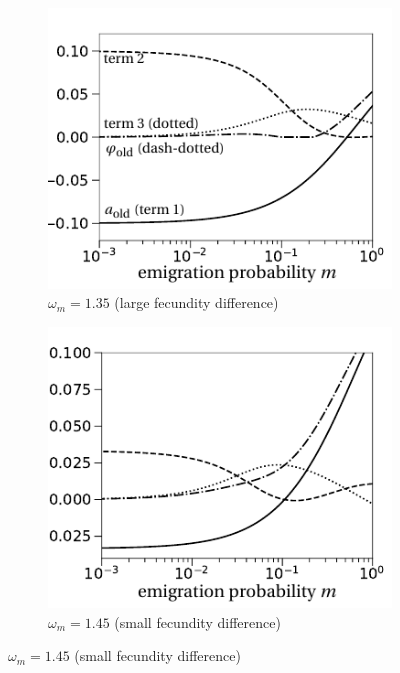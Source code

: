 \documentclass[a4paper,11pt]{scrartcl}
\begin{document}
\begin{figure}[t!]
\begin{subfigure}{.5\textwidth}
  		\includegraphics[width=\linewidth]{figS1c.pdf}
  		\caption{$\omega_m=1.35$ (large fecundity difference)}
	\end{subfigure}%
	\begin{subfigure}{.5\textwidth}
 		 \centering
 		 \includegraphics[width=\linewidth]{figS1d.pdf}
  	\caption{$\omega_m=1.45$ (small fecundity difference)}
	\end{subfigure}

\end{figure}
\end{document}
